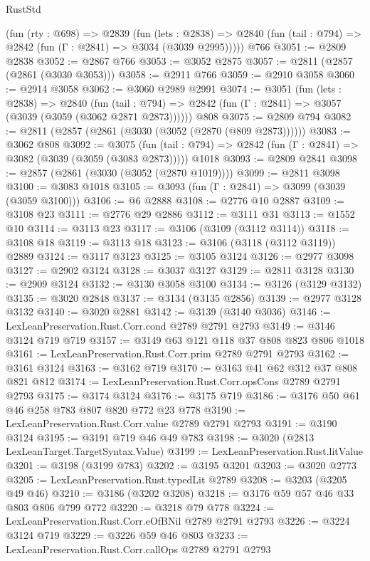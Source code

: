 \begin{lexlean}{RustStd}
\begin{coremodule}
    (fun (rty : @698) =>
    @2839
      (fun (lets : @2838) =>
      @2840 (fun (tail : @794) => @2842 (fun (Γ : @2841) => @3034 (@3039 @2995)))))
    @766
@3051 := @2809 @2838
@3052 := @2867 @766
@3053 := @3052 @2875
@3057 := @2811 (@2857 (@2861 (@3030 @3053)))
@3058 := @2911 @766
@3059 := @2910 @3058
@3060 := @2914 @3058
@3062 := @3060 @2989 @2991
@3074 := @3051
    (fun (lets : @2838) =>
    @2840
      (fun (tail : @794) => @2842 (fun (Γ : @2841) => @3057 (@3039 (@3059 (@3062 @2871 @2873))))))
    @808
@3075 := @2809 @794
@3082 := @2811 (@2857 (@2861 (@3030 (@3052 (@2870 (@809 @2873))))))
@3083 := @3062 @808
@3092 := @3075
    (fun (tail : @794) => @2842 (fun (Γ : @2841) => @3082 (@3039 (@3059 (@3083 @2873)))))
    @1018
@3093 := @2809 @2841
@3098 := @2857 (@2861 (@3030 (@3052 (@2870 @1019))))
@3099 := @2811 @3098
@3100 := @3083 @1018
@3105 := @3093 (fun (Γ : @2841) => @3099 (@3039 (@3059 @3100)))
@3106 := @6 @2888
@3108 := @2776 @10 @2887
@3109 := @3108 @23
@3111 := @2776 @29 @2886
@3112 := @3111 @31
@3113 := @1552 @10
@3114 := @3113 @23
@3117 := @3106 (@3109 (@3112 @3114))
@3118 := @3108 @18
@3119 := @3113 @18
@3123 := @3106 (@3118 (@3112 @3119)) @2889
@3124 := @3117 @3123
@3125 := @3105 @3124
@3126 := @2977 @3098
@3127 := @2902 @3124
@3128 := @3037 @3127
@3129 := @2811 @3128
@3130 := @2909 @3124
@3132 := @3130 @3058 @3100
@3134 := @3126 (@3129 @3132)
@3135 := @3020 @2848
@3137 := @3134 (@3135 @2856)
@3139 := @2977 @3128 @3132
@3140 := @3020 @2881
@3142 := @3139 (@3140 @3036)
@3146 := LexLeanPreservation.Rust.Corr.cond @2789 @2791 @2793
@3149 := @3146 @3124 @719 @719
@3157 := @3149 @63 @121 @118 @37 @808 @823 @806 @1018
@3161 := LexLeanPreservation.Rust.Corr.prim @2789 @2791 @2793
@3162 := @3161 @3124
@3163 := @3162 @719
@3170 := @3163 @41 @62 @312 @37 @808 @821 @812
@3174 := LexLeanPreservation.Rust.Corr.opsCons @2789 @2791 @2793
@3175 := @3174 @3124
@3176 := @3175 @719
@3186 := @3176 @50 @61 @46 @258 @783 @807 @820 @772 @23 @778
@3190 := LexLeanPreservation.Rust.Corr.value @2789 @2791 @2793
@3191 := @3190 @3124
@3195 := @3191 @719 @46 @49 @783
@3198 := @3020 (@2813 LexLeanTarget.TargetSyntax.Value)
@3199 := LexLeanPreservation.Rust.litValue
@3201 := @3198 (@3199 @783)
@3202 := @3195 @3201
@3203 := @3020 @2773
@3205 := LexLeanPreservation.Rust.typedLit @2789
@3208 := @3203 (@3205 @49 @46)
@3210 := @3186 (@3202 @3208)
@3218 := @3176 @59 @57 @46 @33 @803 @806 @799 @772
@3220 := @3218 @79 @778
@3224 := LexLeanPreservation.Rust.Corr.eOfBNil @2789 @2791 @2793
@3226 := @3224 @3124 @719
@3229 := @3226 @59 @46 @803
@3233 := LexLeanPreservation.Rust.Corr.callOps @2789 @2791 @2793

\end{coremodule}
\end{lexlean}
